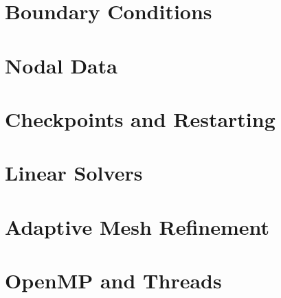 \section{Boundary Conditions}

\section{Nodal Data}

\section{Checkpoints and Restarting}

\section{Linear Solvers}

\section{Adaptive Mesh Refinement}

\section{OpenMP and Threads}
